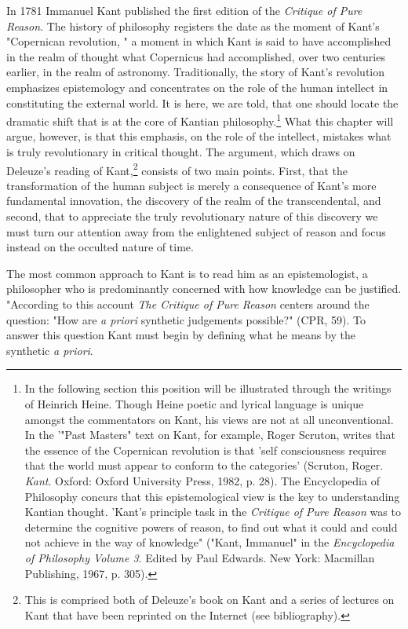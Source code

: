 In 1781 Immanuel Kant published the first edition of the \textit{Critique of Pure Reason}. The history of philosophy registers the date as the moment of Kant's "Copernican revolution, " a moment in which Kant is said to have accomplished in the realm of thought what Copernicus had accomplished, over two centuries earlier, in the realm of astronomy. Traditionally, the story of Kant's revolution emphasizes epistemology and concentrates on the role of the human intellect in constituting the external world. It is here, we are told, that one should locate the dramatic shift that is at the core of Kantian philosophy.\footnote{ In the following section this position will be illustrated through the writings of Heinrich
Heine. Though Heine poetic and lyrical language is unique amongst the
commentators on Kant, his views are not at all unconventional. In the '"Past Masters" text on Kant, for example, Roger Scruton, writes that the essence of the Copernican revolution is that 'self consciousness requires that the world must appear to conform to the categories' (Scruton, Roger. \textit{Kant}. Oxford: Oxford University Press, 1982, p. 28). The Encyclopedia of Philosophy concurs that this epistemological view is the key to understanding Kantian thought. 'Kant's principle task in the \textit{Critique of Pure Reason} was to determine the cognitive powers of reason, to find out what it could and could not achieve in the way of knowledge" ("Kant, Immanuel" in the \textit{Encyclopedia of Philosophy Volume 3}. Edited by Paul Edwards. New York: Macmillan Publishing, 1967, p. 305).} What this chapter will argue, however, is that this emphasis, on the role of the intellect, mistakes what is truly revolutionary in critical thought. The argument, which draws on Deleuze's reading of Kant,\footnote{This is comprised both of Deleuze's book on Kant and a series of lectures on Kant that have been reprinted on the Internet (see bibliography).} consists of two main points. First, that the transformation of the human subject is merely a consequence of Kant's more fundamental innovation, the discovery of the realm of the transcendental, and second, that to appreciate the truly revolutionary nature of this discovery we must turn our attention away from the enlightened subject of reason and focus instead on the occulted nature of time.

The most common approach to Kant is to read him as an epistemologist, a philosopher who is predominantly concerned with how knowledge can be justified. "According to this account \textit{The Critique of Pure Reason} centers around the question: "How are \textit{a priori} synthetic judgements possible?" (CPR, 59). To answer this question Kant must begin by defining what he means by the synthetic \textit{a priori}. 

